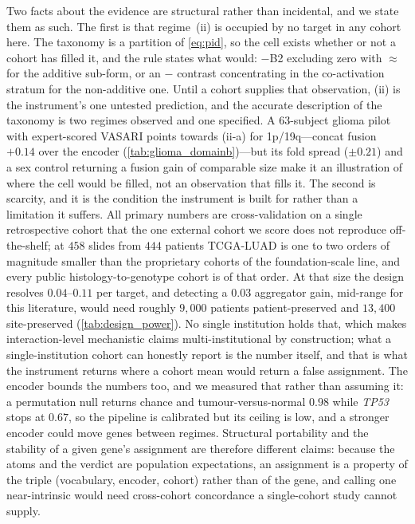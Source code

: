 Two facts about the evidence are structural rather than incidental, and
we state them as such. The first is that regime~(ii) is occupied by no
target in any cohort here. The taxonomy is a partition of
\cref{eq:pid}, so the cell exists whether or not a cohort has filled
it, and the rule states what would: \piabmil{}$-$B2 excluding zero with
\fcmil{}$\approx$\piabmil{} for the additive sub-form, or an
\fcmil{}$-$\piabmil{} contrast concentrating in the co-activation
stratum for the non-additive one. Until a cohort supplies that
observation, (ii) is the instrument's one untested prediction, and the
accurate description of the taxonomy is two regimes observed and one
specified. A $63$-subject glioma pilot with expert-scored VASARI points
towards (ii-a) for 1p/19q---concat fusion $+0.14$ over the encoder
(\cref{tab:glioma_domainb})---but its fold spread ($\pm0.21$) and a sex
control returning a fusion gain of comparable size make it an
illustration of where the cell would be filled, not an observation that
fills it. The second is scarcity, and it is the condition the
instrument is built for rather than a limitation it suffers. All
primary numbers are cross-validation on a single retrospective cohort
that the one external cohort we score does not reproduce off-the-shelf;
at $458$ slides from $444$ patients TCGA-LUAD is one to two orders of
magnitude smaller than the proprietary cohorts of the foundation-scale
line, and every public histology-to-genotype cohort is of that order.
At that size the design resolves $0.04$--$0.11$ \auroc{} per target, and
detecting a $0.03$ aggregator gain, mid-range for this literature,
would need roughly $9{,}000$ patients patient-preserved and $13{,}400$
site-preserved (\cref{tab:design_power}). No single institution holds
that, which makes interaction-level mechanistic claims
multi-institutional by construction; what a single-institution cohort
can honestly report is the number itself, and that is what the
instrument returns where a cohort mean would return a false assignment.
The encoder bounds the numbers too, and we measured that rather than
assuming it: a permutation null returns chance and tumour-versus-normal
$0.98$ while \textit{TP53} stops at $0.67$, so the pipeline is
calibrated but its ceiling is low, and a stronger encoder could move
genes between regimes. Structural portability and the stability of a
given gene's assignment are therefore different claims: because the
atoms and the verdict are population expectations, an assignment is a
property of the triple (vocabulary, encoder, cohort) rather than of the
gene, and calling one near-intrinsic would need cross-cohort concordance
a single-cohort study cannot supply.

